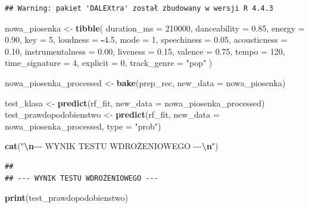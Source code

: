 \documentclass[
]{article}
\newenvironment{Shaded}{\begin{snugshade}}{\end{snugshade}}
\newcommand{\AttributeTok}[1]{\textcolor[rgb]{0.13,0.29,0.53}{#1}}
\newcommand{\DecValTok}[1]{\textcolor[rgb]{0.00,0.00,0.81}{#1}}
\newcommand{\FloatTok}[1]{\textcolor[rgb]{0.00,0.00,0.81}{#1}}
\newcommand{\FunctionTok}[1]{\textcolor[rgb]{0.13,0.29,0.53}{\textbf{#1}}}
\newcommand{\NormalTok}[1]{#1}
\newcommand{\OtherTok}[1]{\textcolor[rgb]{0.56,0.35,0.01}{#1}}
\newcommand{\SpecialCharTok}[1]{\textcolor[rgb]{0.81,0.36,0.00}{\textbf{#1}}}
\newcommand{\StringTok}[1]{\textcolor[rgb]{0.31,0.60,0.02}{#1}}
\begin{document}
\begin{verbatim}
## Warning: pakiet 'DALEXtra' został zbudowany w wersji R 4.4.3
\end{verbatim}

\begin{Shaded}
\begin{Highlighting}[]
\NormalTok{nowa\_piosenka }\OtherTok{\textless{}{-}} \FunctionTok{tibble}\NormalTok{(}
  \AttributeTok{duration\_ms =} \DecValTok{210000}\NormalTok{,}
  \AttributeTok{danceability =} \FloatTok{0.85}\NormalTok{,}
  \AttributeTok{energy =} \FloatTok{0.90}\NormalTok{,}
  \AttributeTok{key =} \DecValTok{5}\NormalTok{,}
  \AttributeTok{loudness =} \SpecialCharTok{{-}}\FloatTok{4.5}\NormalTok{,}
  \AttributeTok{mode =} \DecValTok{1}\NormalTok{,}
  \AttributeTok{speechiness =} \FloatTok{0.05}\NormalTok{,}
  \AttributeTok{acousticness =} \FloatTok{0.10}\NormalTok{,}
  \AttributeTok{instrumentalness =} \FloatTok{0.00}\NormalTok{,}
  \AttributeTok{liveness =} \FloatTok{0.15}\NormalTok{,}
  \AttributeTok{valence =} \FloatTok{0.75}\NormalTok{,}
  \AttributeTok{tempo =} \DecValTok{120}\NormalTok{,}
  \AttributeTok{time\_signature =} \DecValTok{4}\NormalTok{,}
  \AttributeTok{explicit =} \DecValTok{0}\NormalTok{,}
  \AttributeTok{track\_genre =} \StringTok{"pop"}
\NormalTok{)}

\NormalTok{nowa\_piosenka\_processed }\OtherTok{\textless{}{-}} \FunctionTok{bake}\NormalTok{(prep\_rec, }\AttributeTok{new\_data =}\NormalTok{ nowa\_piosenka)}

\NormalTok{test\_klasa }\OtherTok{\textless{}{-}} \FunctionTok{predict}\NormalTok{(rf\_fit, }\AttributeTok{new\_data =}\NormalTok{ nowa\_piosenka\_processed)}
\NormalTok{test\_prawdopodobienstwo }\OtherTok{\textless{}{-}} \FunctionTok{predict}\NormalTok{(rf\_fit, }\AttributeTok{new\_data =}\NormalTok{ nowa\_piosenka\_processed, }\AttributeTok{type =} \StringTok{"prob"}\NormalTok{)}

\FunctionTok{cat}\NormalTok{(}\StringTok{"}\SpecialCharTok{\textbackslash{}n}\StringTok{{-}{-}{-} WYNIK TESTU WDROŻENIOWEGO {-}{-}{-}}\SpecialCharTok{\textbackslash{}n}\StringTok{"}\NormalTok{)}
\end{Highlighting}
\end{Shaded}

\begin{verbatim}
## 
## --- WYNIK TESTU WDROŻENIOWEGO ---
\end{verbatim}

\begin{Shaded}
\begin{Highlighting}[]
\FunctionTok{print}\NormalTok{(test\_prawdopodobienstwo)}
\end{Highlighting}
\end{Shaded}
\end{document}
